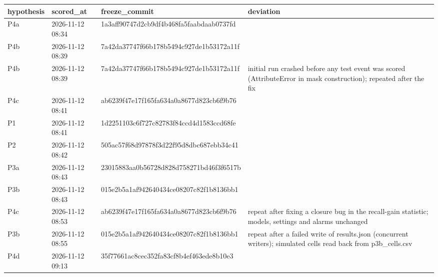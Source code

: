 \begin{tabular}{llll}
\toprule
hypothesis & scored\_at & freeze\_commit & deviation \\
\midrule
P4a & 2026-11-12 08:34 & 1a3aff90747d2cb9df4b468fa5faabdaab0737fd &  \\
P4b & 2026-11-12 08:39 & 7a42da37747f66b178b5494c927de1b53172a11f &  \\
P4b & 2026-11-12 08:39 & 7a42da37747f66b178b5494c927de1b53172a11f & initial run crashed before any test event was scored (AttributeError in mask construction); repeated after the fix \\
P4c & 2026-11-12 08:41 & ab6239f47e17f165fa634a0a8677d823cb6f9b76 &  \\
P1 & 2026-11-12 08:41 & 1d2251103c6f727c82783f84ccd4d1583ccd68fe &  \\
P2 & 2026-11-12 08:42 & 505ac57f68d97878f3d22f95d8dbc687ebb34c41 &  \\
P3a & 2026-11-12 08:43 & 23015883aa0b56728d828d758271bd46f3f6517b &  \\
P3b & 2026-11-12 08:43 & 015e2b5a1af942640434ce08207c82f1b8136bb1 &  \\
P4c & 2026-11-12 08:53 & ab6239f47e17f165fa634a0a8677d823cb6f9b76 & repeat after fixing a closure bug in the recall-gain statistic; models, settings and alarms unchanged \\
P3b & 2026-11-12 08:55 & 015e2b5a1af942640434ce08207c82f1b8136bb1 & repeat after a failed write of results.json (concurrent writers); simulated cells read back from p3b\_cells.csv \\
P4d & 2026-11-12 09:13 & 35f77661ac8cec352fa83cf8b4ef463ede8b10e3 &  \\
\bottomrule
\end{tabular}
